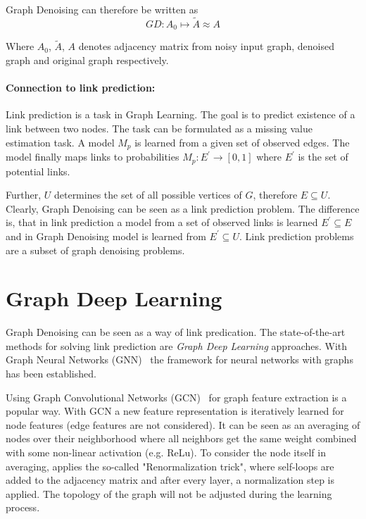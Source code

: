 Graph Denoising can therefore be written as 
\begin{equation}
    GD: A_0 \mapsto \tilde{A} \approx A
\end{equation}

Where $A_0$, $\tilde{A}$, $A$ denotes adjacency matrix from noisy input graph, denoised graph and original graph respectively.


\paragraph{Connection to link prediction:}
Link prediction is a task in Graph Learning. 
The goal is to predict existence of a link between two nodes.
The task can be formulated as a missing value estimation task. A model $M_p$ is learned
from a given set of observed edges. The model finally maps links to probabilities
$M_p : E^{\prime} \rightarrow [0,1]$ where $E^{\prime}$ is the set of potential links.

Further, $U$ determines the set of all possible vertices of $G$, therefore $E \subseteq U$.
Clearly, Graph Denoising can be seen as a link prediction problem.
The difference is, that in link prediction a model from a set of observed links is learned
$E^{\prime} \subseteq E$ and in Graph Denoising model is learned from 
$E^{\prime} \subseteq U$. 
Link prediction problems are a subset of graph denoising problems.

\section{Graph Deep Learning}
\label{sec:graph_depp_learning}
Graph Denoising can be seen as a way of link predication. 
The state-of-the-art methods for solving link prediction are \textit{Graph Deep Learning} approaches.
With Graph Neural Networks (GNN)~\cite{GNN} the framework
for neural networks with graphs has been established. 

Using Graph Convolutional Networks (GCN)~\cite{GCN} for graph feature extraction is a popular way. 
With GCN a new feature representation is iteratively learned for node features (edge features are not considered).
It can be seen as an averaging of nodes over their neighborhood where all neighbors get the same weight combined with some non-linear activation (e.g. ReLu). 
To consider the node itself in averaging, \citet{GCN} applies the so-called "Renormalization trick", where self-loops are added to the 
adjacency matrix and after every layer, a normalization step is applied. 
The topology of the graph will not be adjusted during the learning process.

